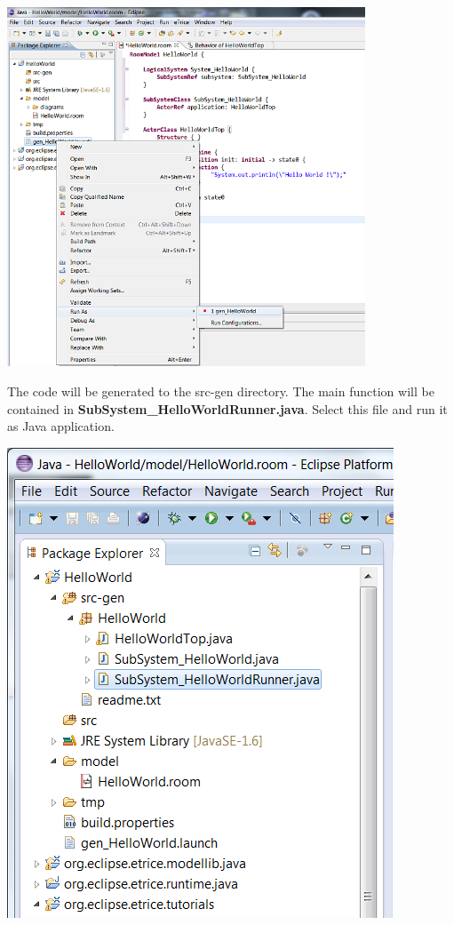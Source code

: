 \includegraphics[width=0.8\textwidth]{images/015-HelloWorld06.png}

The code will be generated to the src-gen directory. The main function will be contained in \textbf{SubSystem\_HelloWorldRunner.java}. Select this file and run it as Java application.

\includegraphics{images/015-HelloWorld07.png}


